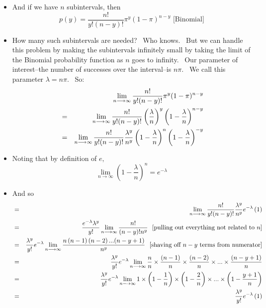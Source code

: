 \documentclass[11pt]{article}
\begin{document}
\begin{itemize}
\begin{itemize}
\item And if we have $n$ subintervals, then%
\begin{equation*}
p(y)=\frac{n!}{y!(n-y)!}\pi ^{y}(1-\pi )^{n-y}\text{ \ [Binomial]}
\end{equation*}

\item How many such subintervals are needed? \ Who knows. \ But we can
handle this problem by making the subintervals infinitely small by taking
the limit of the Binomial probability function as $n$ goes to infinity. \
Our parameter of interest--the number of successes over the interval--is $%
n\pi .$ \ We call this parameter $\lambda =n\pi .$ \ So:%
\begin{eqnarray*}
&&\lim_{n\longrightarrow \infty }\frac{n!}{y!(n-y)!}\pi ^{y}(1-\pi )^{n-y} \\
&=&\lim_{n\longrightarrow \infty }\frac{n!}{y!(n-y)!}\left( \frac{\lambda }{n%
}\right) ^{y}\left( 1-\frac{\lambda }{n}\right) ^{n-y} \\
&=&\lim_{n\longrightarrow \infty }\frac{n!}{y!(n-y)!}\frac{\lambda ^{y}}{%
n^{y}}\left( 1-\frac{\lambda }{n}\right) ^{n}\left( 1-\frac{\lambda }{n}%
\right) ^{-y}
\end{eqnarray*}

\item Noting that by definition of $e,$%
\begin{equation*}
\lim_{n\longrightarrow \infty }\left( 1-\frac{\lambda }{n}\right)
^{n}=e^{-\lambda }
\end{equation*}

\item And so%
\begin{eqnarray*}
&=&\lim_{n\longrightarrow \infty }\frac{n!}{y!(n-y)!}\frac{\lambda ^{y}}{%
n^{y}}e^{-\lambda }\left( 1\right) \\
&=&\frac{e^{-\lambda }\lambda ^{y}}{y!}\lim_{n\longrightarrow \infty }\frac{%
n!}{(n-y)!n^{y}}\text{ \ [pulling out everything not related to }n\text{]} \\
&=&\frac{\lambda ^{y}}{y!}e^{-\lambda }\lim_{n\longrightarrow \infty }\frac{%
n\left( n-1\right) \left( n-2\right) ...(n-y+1)}{n^{y}}\text{ \ [shaving off 
}n-y\text{ terms from numerator]} \\
&=&\frac{\lambda ^{y}}{y!}e^{-\lambda }\lim_{n\longrightarrow \infty }\frac{n%
}{n}\times \frac{\left( n-1\right) }{n}\times \frac{\left( n-2\right) }{n}%
\times ...\times \frac{(n-y+1)}{n} \\
&=&\frac{\lambda ^{y}}{y!}e^{-\lambda }\lim_{n\longrightarrow \infty
}1\times \left( 1-\frac{1}{n}\right) \times \left( 1-\frac{2}{n}\right)
\times ...\times \left( 1-\frac{y+1}{n}\right) \\
&=&\frac{\lambda ^{y}}{y!}e^{-\lambda }\left( 1\right)
\end{eqnarray*}


\end{itemize}
\end{itemize}
\end{document}
